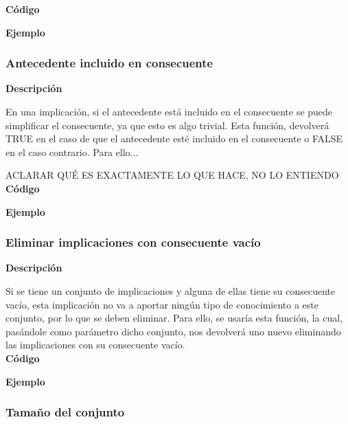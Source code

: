     \textbf{C\'odigo}

    

    \textbf{Ejemplo}



\subsubsection{Antecedente incluido en consecuente}

    \textbf{Descripci\'on}

    En una implicaci\'on, si el antecedente est\'a incluido en el consecuente se puede simplificar el consecuente, ya que 
    esto es algo trivial. Esta funci\'on, devolver\'a TRUE en el caso de que el antecedente est\'e incluido en el consecuente o 
    FALSE en el caso contrario. Para ello...

    ACLARAR QU\'E ES EXACTAMENTE LO QUE HACE, NO LO ENTIENDO
    \\


    \textbf{C\'odigo}

    


    \textbf{Ejemplo}


\subsubsection{Eliminar implicaciones con consecuente vac\'io}

    \textbf{Descripci\'on}

    Si se tiene un conjunto de implicaciones y alguna de ellas tiene su consecuente vac\'io, esta implicaci\'on no va a 
    aportar ning\'un tipo de conocimiento a este conjunto, por lo que se deben eliminar. Para ello, se usar\'ia esta funci\'on, 
    la cual, pas\'andole como par\'ametro dicho conjunto, nos devolver\'a uno nuevo eliminando las implicaciones con su consecuente 
    vac\'io.
    \\


    \textbf{C\'odigo}

    


    \textbf{Ejemplo}


\subsubsection{Tama\~no del conjunto}

